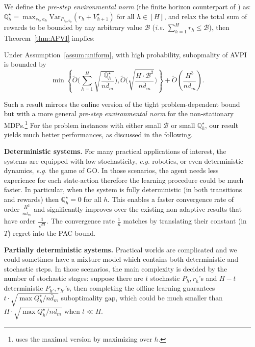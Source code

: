 We define the \emph{pre-step environmental norm} (the finite horizon counterpart of \cite{maillard2014hard}) as: $\mathbb{Q}^\star_h=\max_{s_h,a_h}\mathrm{Var}_{P_{s_h,a_h}}(r_h+V^\star_{h+1})$ for all $h\in[H]$, and relax the total sum of rewards to be bounded by any arbitrary value $\mathcal{B}$ (\emph{i.e.} $\sum_{h=1}^H r_h\leq \mathcal{B}$), then Theorem~\ref{thm:APVI} implies:
\begin{proposition}\label{prop}
	Under Assumption~\ref{assum:uniform}, with high probability, subopmality of AVPI is bounded by 
	{
	\[
	\min\left\{\widetilde{O}\big(\sum_{h=1}^H\sqrt{\frac{\mathbb{Q}^\star_h}{n\bar{d}_m}}\big),\widetilde{O}\big(\sqrt{\frac{H\cdot \mathcal{B}^2}{n\bar{d}_m}}\big)\right\}+\widetilde{O}(\frac{H^3}{n\bar{d}_m}).
	\]}  
\end{proposition} 
Such a result mirrors the online version of the tight problem-dependent bound \cite{zanette2019tighter} but with a more general \emph{pre-step environmental norm} for the non-stationary MDPs.\footnote{\cite{zanette2019tighter} uses the maximal version by maximizing over $h$.} For the problem instances with either small $\mathcal{B}$ or small $\mathbb{Q}_h^\star$, our result yields much better performances, as discussed in the following.

\textbf{Deterministic systems.} For many practical applications of interest, the systems are equipped with low stochasticity, \emph{e.g.} robotics, or even deterministic dynamics, \emph{e.g.} the game of GO. In those scenarios, the agent needs less experience for each state-action therefore the learning procedure could be much faster. In particular, when the system is fully deterministic (in both transitions and rewards) then $\mathbb{Q}^\star_h=0$ for all $h$. This enables a faster convergence rate of order $\frac{H^3}{n\bar{d}_m}$ and significantly improves over the existing non-adaptive results that have order $\frac{1}{\sqrt{n}}$. The convergence rate $\frac{1}{n}$ matches \cite{wen2013efficient} by translating their constant (in $T$) regret into the PAC bound.

\textbf{Partially deterministic systems.} Practical worlds are complicated and we could sometimes have a mixture model which contains both deterministic and stochastic steps. In those scenarios, the main complexity is decided by the number of stochastic stages: suppose there are $t$ stochastic $P_h,r_h$'s and $H-t$ deterministic $P_{h'},r_{h'}$'s, then completing the offline learning guarantees {\small$t\cdot\sqrt{{\max Q^\star_h}/{n \bar{d}_m}}$} suboptimality gap, which could be much smaller than {\small$H\cdot\sqrt{{\max Q^\star_h}/{n \bar{d}_m}}$} when $t\ll H$. 

